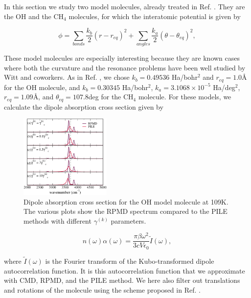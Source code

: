 \documentclass[aps,prb,superscriptaddress,amsmath,amssymb,showpacs,twocolumn]{revtex4}
\begin{document}
In this section we study two model molecules, already treated in Ref. \cite{witt+09jcp}.
They are the OH and the CH$_4$ molecules, for which the interatomic potential is
given by

\begin{equation}
\phi=\sum_{bonds} \frac{k_b}{2} (r-r_{eq})^2 + \sum_{angles} \frac{k_a}{2}(\theta - \theta_{eq})^2,
\end{equation}

These model molecules are especially interesting because they are known cases where
both the curvature and the resonance problems have been well studied by Witt and coworkers\cite{witt+09jcp}.
As in Ref. \cite{witt+09jcp}, we chose $k_b=0.49536$ Ha/bohr$^2$ and $r_{eq}=1.0$\AA~ for the OH molecule,
and  $k_b=0.30345$ Ha/bohr$^2$, $k_a=3.1068\times10^{-5}$ Ha/deg$^2$, $r_{eq}=1.09$\AA, and $\theta_{eq}=107.8$deg for
the CH$_4$ molecule. For these models, we calculate the dipole absorption cross section given by 


\begin{figure}[htbp]
\centering
\includegraphics[width=0.4\textwidth]{figures/oh_rpmdvspiledampings_109K.pdf}
\caption{Dipole absorption cross section for the OH model molecule at 109K. The various plots show the RPMD spectrum compared to the PILE methods with different $\gamma^{(k)}$ parameters.}
\label{fig:oh-rpmd-pile-dampings}
\end{figure}

\begin{equation}
n(\omega)\alpha(\omega)= \frac{\pi \beta \omega^2}{3cV\epsilon_0} \tilde{I}(\omega),
\end{equation}

\noindent where $\tilde{I}(\omega)$ is the Fourier transform of the Kubo-transformed dipole autocorrelation function.
It is this autocorrelation function that we approximate with CMD, RPMD, and the PILE method. We here also filter out
translations and rotations of the molecule using the scheme proposed in Ref. \cite{witt+09jcp}.
\end{document}
